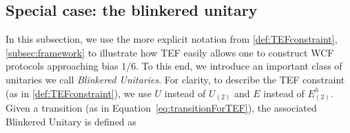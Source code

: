 \documentclass{article}
\begin{document}
%
%
%
%


\subsection{Special case: the blinkered unitary\label{subsec:BlinkeredUnitary}}
In this subsection, we use the more explicit notation from \cref{def:TEFconstraint}, \cref{subsec:framework} to illustrate how TEF easily allows one to construct WCF protocols approaching bias $1/6$. To this end, we introduce an important class of unitaries we call \emph{Blinkered Unitaries}. For clarity, to describe the TEF constraint (as in \cref{def:TEFconstraint}), we use $U$ instead of $U_{(2)}$ and $E$ instead of $E^h_{(2)}$. Given a transition (as in Equation~\eqref{eq:transitionForTEF}), the associated Blinkered Unitary is defined as
%

%
%
%
%
\end{document}
